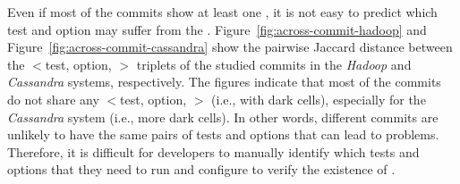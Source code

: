 Even if most of the commits show at least one \inconsistent, it is not easy to predict which test and option may suffer from the \inconsistent. 
Figure~\ref{fig:across-commit-hadoop} and Figure~\ref{fig:across-commit-cassandra} show the pairwise Jaccard distance between the $<$test, option, \inconsistent$>$ triplets of the studied commits in the \emph{Hadoop} and \emph{Cassandra} systems, respectively. %
The figures indicate that most of the commits do not share any $<$test, option, \inconsistent$>$ (i.e., with dark cells), especially for the \emph{Cassandra} system (i.e., more dark cells).
In other words, different commits are unlikely to have the same pairs of tests and options that can lead to \inconsistent problems. %
Therefore, it is difficult for developers to manually identify which tests and options that they need to run and configure to verify the existence of \inconsistent. %

